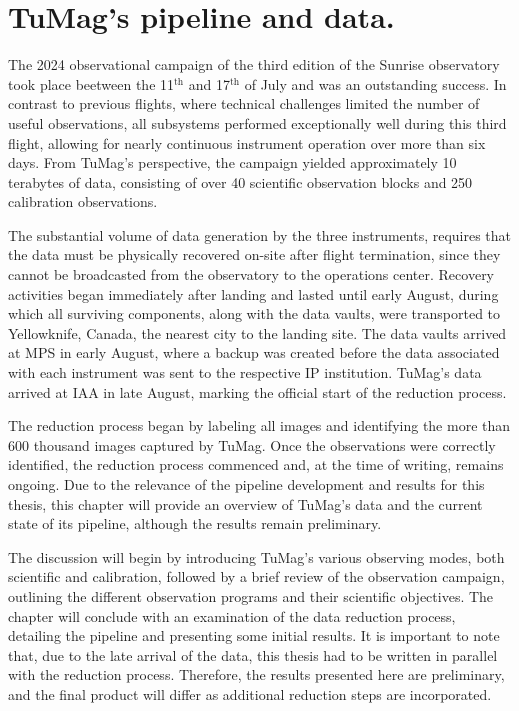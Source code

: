 \chapter{\label{CH:Pipeline}TuMag's pipeline and data.}


The 2024 observational campaign of the third edition of the Sunrise observatory took place beetween the 11$^{\text{th}}$ and 17$^{\text{th}}$ of July and was an outstanding success. In contrast to previous flights, where technical challenges limited the number of useful observations, all subsystems performed exceptionally well during this third flight, allowing for nearly continuous instrument operation over more than six days. From TuMag’s perspective, the campaign yielded approximately 10 terabytes of data, consisting of over 40 scientific observation blocks and 250 calibration observations.

The substantial volume of data generation by the three instruments, requires that the data must be physically recovered on-site after flight termination, since they cannot be broadcasted from the observatory to the operations center. Recovery activities began immediately after landing and lasted until early August, during which all surviving components, along with the data vaults, were transported to Yellowknife, Canada, the nearest city to the landing site. The data vaults arrived at MPS in early August, where a backup was created before the data associated with each instrument was sent to the respective IP institution. TuMag’s data arrived at  IAA in late August, marking the official start of the reduction process.

The reduction process began by labeling all images and identifying the more than 600 thousand images captured by TuMag. Once the observations were correctly identified, the reduction process commenced and, at the time of writing, remains ongoing. Due to the relevance of the pipeline development and results for this thesis, this chapter will provide an overview of TuMag's data and the current state of its pipeline, although the results remain preliminary.

The discussion will begin by introducing TuMag’s various observing modes, both scientific and calibration, followed by a brief review of the observation campaign, outlining the different observation programs and their scientific objectives. The chapter will conclude with an examination of the data reduction process, detailing the pipeline and presenting some initial results. It is important to note that, due to the late arrival of the data, this thesis had to be written in parallel with the reduction process. Therefore, the results presented here are preliminary, and the final product will differ as additional reduction steps are incorporated.

